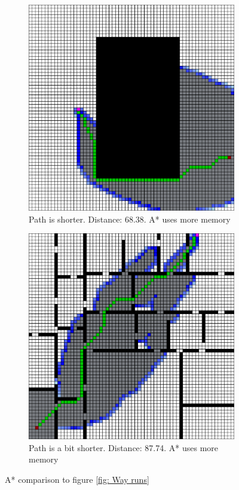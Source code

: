 \begin{figure}[h!]
\begin{subfigure}[b]{0.33\linewidth}
    \includegraphics[width=\linewidth]{images/a_star_2_map.png}
    \caption{Path is shorter. Distance: 68.38. A* uses more memory \newline}
  \end{subfigure}
  \hfill
  \begin{subfigure}[b]{0.33\linewidth}
    \includegraphics[width=\linewidth]{images/a_star_3_map.png}
    \caption{Path is a bit shorter. Distance: 87.74. A* uses more memory\newline}
  \end{subfigure}
  \caption{A* comparison to figure \ref{fig: Way runs}}
  \label{fig: Way runs comp}
\end{figure}

\pagebreak